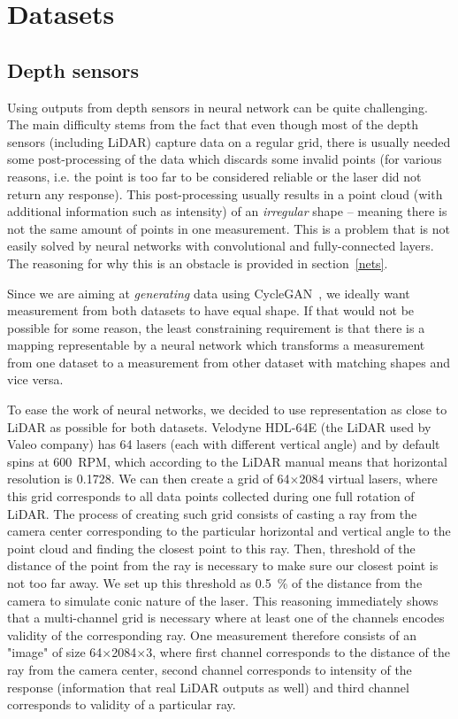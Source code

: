 \chapter{Datasets} \label{dataset}

\section{Depth sensors}
Using outputs from depth sensors in neural network can be quite challenging. The main difficulty stems from the fact that even though most of the depth sensors (including LiDAR) capture data on a regular grid, there is usually needed some post-processing of the data which discards some invalid points (for various reasons, i.e. the point is too far to be considered reliable or the laser did not return any response). This post-processing usually results in a point cloud (with additional information such as intensity) of an {\em irregular} shape -- meaning there is not the same amount of points in one measurement. This is a problem that is not easily solved by neural networks with convolutional and fully-connected layers. The reasoning for why this is an obstacle is provided in section~\ref{nets}.

Since we are aiming at {\em generating} data using CycleGAN~\cite{cyclegan}, we ideally want measurement from both datasets to have equal shape. If that would not be possible for some reason, the least constraining requirement is that there is a mapping representable by a neural network which transforms a measurement from one dataset to a measurement from other dataset with matching shapes and vice versa.

To ease the work of neural networks, we decided to use representation as close to LiDAR as possible for both datasets. Velodyne HDL-64E (the LiDAR used by Valeo company) has 64 lasers (each with different vertical angle) and by default spins at 600~RPM, which according to the LiDAR manual  means that horizontal resolution is 0.1728\degree{}. We can then create a grid of 64$\times$2084 virtual lasers, where this grid corresponds to all data points collected during one full rotation of LiDAR. The process of creating such grid consists of casting a ray from the camera center corresponding to the particular horizontal and vertical angle to the point cloud and finding the closest point to this ray. Then, threshold of the distance of the point from the ray is necessary to make sure our closest point is not too far away. We set up this threshold as 0.5~\% of the distance from the camera to simulate conic nature of the laser. This reasoning immediately shows that a multi-channel grid is necessary where at least one of the channels encodes validity of the corresponding ray. One measurement therefore consists of an "image" of size 64$\times$2084$\times$3, where first channel corresponds to the distance of the ray from the camera center, second channel corresponds to intensity of the response (information that real LiDAR outputs as well) and third channel corresponds to validity of a particular ray.

